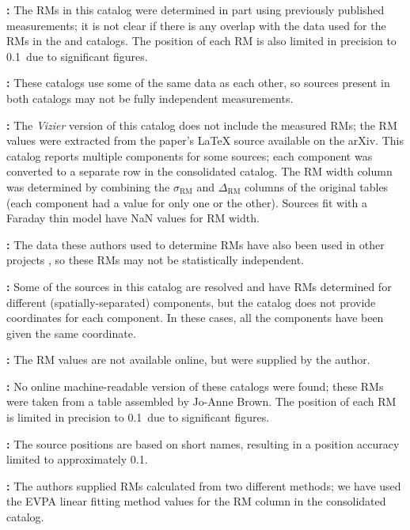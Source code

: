 \documentclass[10pt,modern]{aastex63}
\begin{document}
{\bf \citet{Simard-Normandin1981}:} The RMs in this catalog were determined in part using previously published measurements; it is not clear if there is any overlap with the data used for the RMs in the \citet{Tabara1980} and \citet{Broten1988} catalogs. The position of each RM is also limited in precision to 0.1\degr\ due to significant figures.

{\bf \citet{Riseley2018, Riseley2020}:} These catalogs use some of the same data as each other, so sources present in both catalogs may not be fully independent measurements.

{\bf \citet{OSullivan2017}:} The {\it Vizier} version of this catalog does not include the measured RMs; the RM values were extracted from the paper's LaTeX source available on the arXiv. This catalog reports multiple components for some sources; each component was converted to a separate row in the consolidated catalog. The RM width column was determined by combining the $\sigma_\mathrm{RM}$ and $\Delta_\mathrm{RM}$ columns of the original tables (each component had a value for only one or the other). Sources fit with a Faraday thin model have NaN values for RM width.

{\bf \citet{Klein2003}:} The data these authors used to determine RMs have also been used in other projects \citep{Rossetti2008, Farnes2014}, so these RMs may not be statistically independent.

{\bf \citet{Heald09}:} Some of the sources in this catalog are resolved and have RMs determined for different (spatially-separated) components, but the catalog does not provide coordinates for each component. In these cases, all the components have been given the same coordinate.

{\bf \citet{Clarke2001}:} The RM values are not available online, but were supplied by the author.

{\bf \citet{Clegg1992, Oren1995, Minter1996}:} No online machine-readable version of these catalogs were found; these RMs were taken from a table assembled by Jo-Anne Brown. The position of each RM is limited in precision to 0.1\degr\ due to significant figures.

{\bf \citet{Battye2011}:} The source positions are based on short names, resulting in a position accuracy limited to approximately 0.1\degr.

{\bf \citet{Costa2018}:} The authors supplied RMs calculated from two different methods; we have used the EVPA linear fitting method values for the RM column in the consolidated catalog.






{} %
\end{document}
